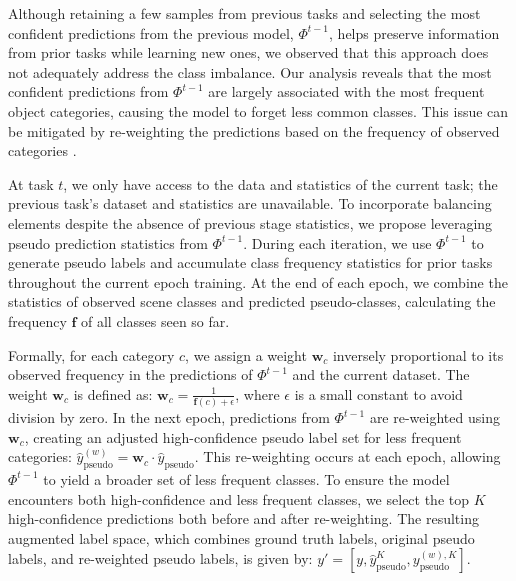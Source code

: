 Although retaining a few samples from previous tasks and selecting the most confident predictions from the previous model, $\Phi^{t-1}$, helps preserve information from prior tasks while learning new ones, we observed that this approach does not adequately address the class imbalance. Our analysis reveals that the most confident predictions from $\Phi^{t-1}$ are largely associated with the most frequent object categories, causing the model to forget less common classes. This issue can be mitigated by re-weighting the predictions based on the frequency of observed categories \cite{islam2021class}.

At task $t$, we only have access to the data and statistics of the current task; the previous task’s dataset and statistics are unavailable. 
To incorporate balancing elements despite the absence of previous stage statistics, we propose leveraging pseudo prediction statistics from $\Phi^{t-1}$.
During each iteration, we use $\Phi^{t-1}$ to generate pseudo labels and accumulate class frequency statistics for prior tasks throughout the current epoch training. At the end of each epoch, we combine the statistics of observed scene classes and predicted pseudo-classes, calculating the frequency $\mathbf{f}$ of all classes seen so far.

Formally, for each category $c$, we assign a weight $\mathbf{w}_c$ inversely proportional to its observed frequency in the predictions of $\Phi^{t-1}$ and the current dataset. The weight $\mathbf{w}_c$ is defined as: $\mathbf{w}_c = \frac{1}{\mathbf{f}(c) + \epsilon}$, where $\epsilon$ is a small constant to avoid division by zero. In the next epoch, predictions from $\Phi^{t-1}$ are re-weighted using $\mathbf{w}_c$, creating an adjusted high-confidence pseudo label set for less frequent categories: $\hat{y}_\mathrm{pseudo}^{(w)} = \mathbf{w}_c \cdot \hat{y}_\mathrm{pseudo}$. This re-weighting occurs at each epoch, allowing $\Phi^{t-1}$ to yield a broader set of less frequent classes. To ensure the model encounters both high-confidence and less frequent classes, we select the top $K$ high-confidence predictions both before and after re-weighting. The resulting augmented label space, which combines ground truth labels, original pseudo labels, and re-weighted pseudo labels, is given by: $y' = [y, \hat{y}_\mathrm{pseudo}^K, y_\mathrm{pseudo}^{(w),K}]$.

